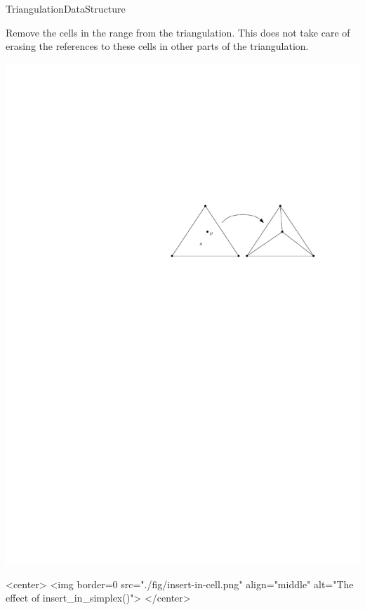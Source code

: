 \begin{ccRefConcept}{TriangulationDataStructure}
\begin{ccAdvanced}
{Remove the cells in the range \ccc{[start,end)} from the triangulation.
This does not take care of erasing the references to these cells in other parts of
the triangulation.}

\end{ccAdvanced}


\begin{ccTexOnly}
\begin{center}
\includegraphics{Triangulation_ref/fig/insert-in-cell.pdf}
\end{center}
\end{ccTexOnly}
\begin{ccHtmlOnly}
<center>
<img border=0 src="./fig/insert-in-cell.png" align="middle" alt="The effect of insert_in_simplex()">
</center>
\end{ccHtmlOnly}


\end{ccRefConcept}

